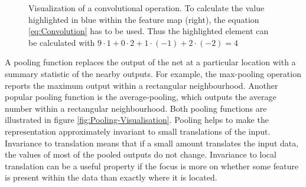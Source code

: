 \begin{figure}[htbp]
    \captionsetup{format=plain}
    \centering
    \caption[Visualization of a convolutional operation]{Visualization of a convolutional operation. To calculate the value highlighted in blue within the feature map (right), the equation \ref{eq:Convolution} has to be used. Thus the highlighted element can be calculated with $9\cdot 1 + 0\cdot 2 + 1\cdot (-1) + 2\cdot (-2) = 4$}
    \label{fig:Convolution-Visualisation}
\end{figure}
\noindent
A pooling function replaces the output of the net at a particular location with a summary statistic of the nearby outputs. For example, the max-pooling operation reports the maximum output within a rectangular neighbourhood. Another popular pooling function is the average-pooling, which outputs the average number within a rectangular neighbourhood. Both pooling functions are illustrated in figure \ref{fig:Pooling-Visualisation}. Pooling helps to make the representation approximately invariant to small translations of the input. Invariance to translation means that if a small amount translates the input data, the values of most of the pooled outputs do not change. Invariance to local translation can be a useful property if the focus is more on whether some feature is present within the data than exactly where it is located.

